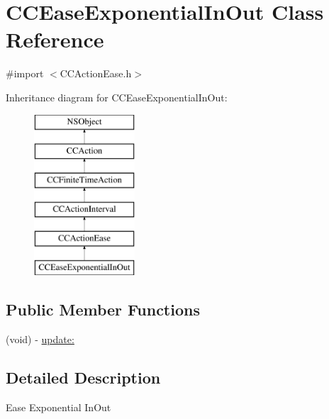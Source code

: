 \hypertarget{interface_c_c_ease_exponential_in_out}{\section{C\-C\-Ease\-Exponential\-In\-Out Class Reference}
\label{interface_c_c_ease_exponential_in_out}
}


{\ttfamily \#import $<$C\-C\-Action\-Ease.\-h$>$}

Inheritance diagram for C\-C\-Ease\-Exponential\-In\-Out\-:\begin{figure}[H]
\begin{center}
\leavevmode
\includegraphics[height=6.000000cm]{interface_c_c_ease_exponential_in_out}
\end{center}
\end{figure}
\subsection*{Public Member Functions}
\begin{DoxyCompactItemize}
\item 
(void) -\/ \hyperlink{interface_c_c_ease_exponential_in_out_a8342f02e1d0678b0f4c8377a5b2de1be}{update\-:}
\end{DoxyCompactItemize}


\subsection{Detailed Description}
Ease Exponential In\-Out 


